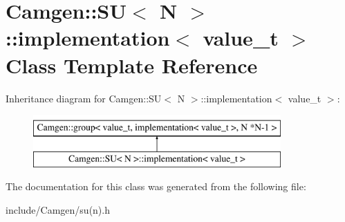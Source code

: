 \hypertarget{a00291}{}\section{Camgen\+:\+:S\+U$<$ N $>$\+:\+:implementation$<$ value\+\_\+t $>$ Class Template Reference}
\label{a00291}
Inheritance diagram for Camgen\+:\+:S\+U$<$ N $>$\+:\+:implementation$<$ value\+\_\+t $>$\+:\begin{figure}[H]
\begin{center}
\leavevmode
\includegraphics[height=2.000000cm]{a00291}
\end{center}
\end{figure}


The documentation for this class was generated from the following file\+:\begin{DoxyCompactItemize}
\item 
include/\+Camgen/su(n).\+h\end{DoxyCompactItemize}
